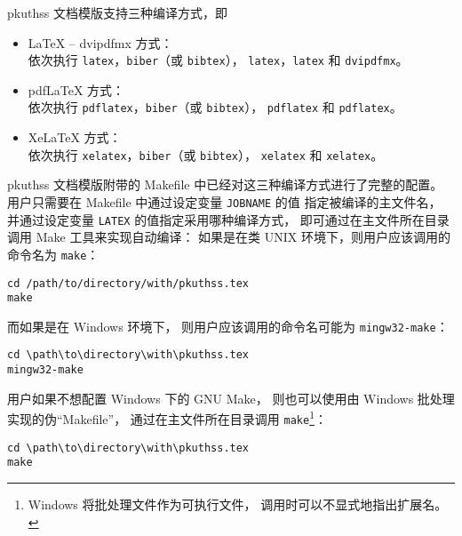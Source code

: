 	pkuthss 文档模版支持三种编译方式，即
	\begin{itemize}
		\item \LaTeX{} -- dvipdfmx 方式：\\
			依次执行 \verb|latex|，\verb|biber|（或 \verb|bibtex|），%
			\verb|latex|，\verb|latex| 和 \verb|dvipdfmx|。\\
		\item pdf\LaTeX{} 方式：\\
			依次执行 \verb|pdflatex|，\verb|biber|（或 \verb|bibtex|），%
			\verb|pdflatex| 和 \verb|pdflatex|。
		\item Xe\LaTeX{} 方式：\\
			依次执行 \verb|xelatex|，\verb|biber|（或 \verb|bibtex|），%
			\verb|xelatex| 和 \verb|xelatex|。\\
	\end{itemize}

	pkuthss 文档模版附带的 Makefile 中已经对这三种编译方式进行了完整的配置。
	用户只需要在 Makefile 中通过设定变量 \verb|JOBNAME| 的值%
	指定被编译的主文件名，
	并通过设定变量 \verb|LATEX| 的值指定采用哪种编译方式，
	即可通过在主文件所在目录调用 Make 工具来实现自动编译：
	如果是在类 UNIX 环境下，则用户应该调用的命令名为 \verb|make|：
\begin{Verbatim}[frame = single]
cd /path/to/directory/with/pkuthss.tex
make
\end{Verbatim}
	而如果是在 Windows 环境下，
	则用户应该调用的命令名可能为 \verb|mingw32-make|：
\begin{Verbatim}[frame = single]
cd \path\to\directory\with\pkuthss.tex
mingw32-make
\end{Verbatim}

	用户如果不想配置 Windows 下的 GNU Make，
	则也可以使用由 Windows 批处理实现的伪“Makefile”，
	通过在主文件所在目录调用 \verb|make|\footnote{%
		Windows 将批处理文件作为可执行文件，
		调用时可以不显式地指出扩展名。%
	}：
\begin{Verbatim}[frame = single]
cd \path\to\directory\with\pkuthss.tex
make
\end{Verbatim}

